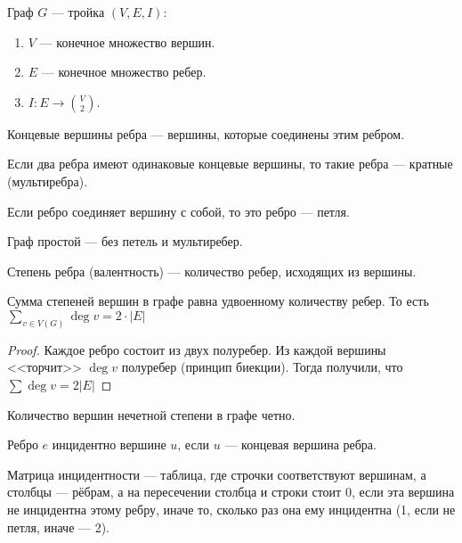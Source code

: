 \begin{definition}
    Граф $G$ --- тройка  $(V, E, I)$:
     \begin{enumerate}
        \item $V$ --- конечное множество вершин.
        \item  $E$ --- конечное множество ребер.
        \item  $I\!: E \to \binom{V}{2}$.
    \end{enumerate}
\end{definition}
\begin{definition}
    Концевые вершины ребра --- вершины, которые соединены этим ребром.
\end{definition}
\begin{definition}
    Если два ребра имеют одинаковые концевые вершины, то такие ребра --- кратные (мультиребра).
\end{definition}
\begin{definition}
    Если ребро соединяет вершину с собой, то это ребро --- петля.
\end{definition}
\begin{definition}
    Граф простой --- без петель и мультиребер.
\end{definition}
\begin{definition}
    Степень ребра (валентность) --- количество ребер, исходящих из вершины.
\end{definition}
\begin{theorem}
    Сумма степеней вершин в графе равна удвоенному количеству ребер. То есть $\displaystyle \sum_{v \in V(G)} \deg v = 2 \cdot |E|$
\end{theorem}
\begin{proof}
    Каждое ребро состоит из двух полуребер. Из каждой вершины <<торчит>> $\deg v$ полуребер (принцип биекции). Тогда получили, что  $\sum \deg v = 2|E|$
\end{proof}
\begin{consequence}
    Количество вершин нечетной степени в графе четно.
\end{consequence}
\begin{definition}
    Ребро $e$ инцидентно вершине $u$, если  $u$ --- концевая вершина ребра. 
\end{definition}

\begin{definition}
	Матрица инцидентности --- таблица, где строчки соответствуют вершинам, а столбцы --- рёбрам, а на пересечении столбца и строки стоит 0, если эта вершина не инцидентна этому ребру, иначе то, сколько раз она ему инцидентна (1, если не петля, иначе --- 2).
\end{definition}

